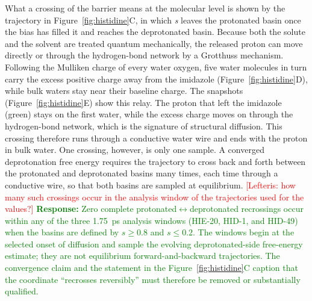 What a crossing of the barrier means at the molecular level is shown by the trajectory in Figure~\ref{fig:histidine}C, in which \emph{s} leaves the protonated basin once the bias has filled it and reaches the deprotonated basin.
Because both the solute and the solvent are treated quantum mechanically, the released proton can move directly or through the hydrogen-bond network by a Grotthuss mechanism.
Following the Mulliken charge of every water oxygen, five water molecules in turn carry the excess positive charge away from the imidazole (Figure~\ref{fig:histidine}D), while bulk waters stay near their baseline charge.
The snapshots (Figure~\ref{fig:histidine}E) show this relay.
The proton that left the imidazole (green) stays on the first water, while the excess charge moves on through the hydrogen-bond network, which is the signature of structural diffusion.\cite{agmonGrotthussMechanism1995,hassanaliProtonTransferWater2013}
This crossing therefore runs through a conductive water wire and ends with the proton in bulk water.
One crossing, however, is only one sample.
A converged deprotonation free energy requires the trajectory to cross back and forth between the protonated and deprotonated basins many times, each time through a conductive wire, so that both basins are sampled at equilibrium. \textcolor{red}{[Lefteris: how many such crossings occur in the analysis window of the trajectories used for the \pka{} values?]}
\textcolor{green}{\textbf{Response:} Zero complete protonated$\leftrightarrow$deprotonated recrossings occur within any of the three 1.75~ps analysis windows (HIE-20, HID-1, and HID-49) when the basins are defined by $s\geq0.8$ and $s\leq0.2$. The windows begin at the selected onset of diffusion and sample the evolving deprotonated-side free-energy estimate; they are not equilibrium forward-and-backward trajectories. The convergence claim and the statement in the Figure~\ref{fig:histidine}C caption that the coordinate ``recrosses reversibly'' must therefore be removed or substantially qualified.}

